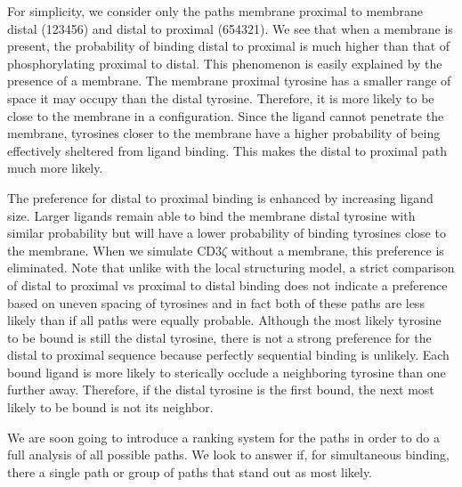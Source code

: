 \documentclass[../../AdvancementSummary.tex]{subfiles}
\begin{document}
For simplicity, we consider only the paths membrane proximal to membrane distal (123456) and distal to proximal (654321). We see that when a membrane is present, the probability of binding distal to proximal is much higher than that of phosphorylating proximal to distal. This phenomenon is easily explained by the presence of a membrane. The membrane proximal tyrosine has a smaller range of space it may occupy than the distal tyrosine.  Therefore, it is more likely to be close to the membrane in a configuration.  Since the ligand cannot penetrate the membrane, tyrosines closer to the membrane have a higher probability of being effectively sheltered from ligand binding. This makes the distal to proximal path much more likely. 

The preference for distal to proximal binding is enhanced by increasing ligand size.  Larger ligands remain able to bind the membrane distal tyrosine with similar probability but will have a lower probability of binding tyrosines close to the membrane. When we simulate CD3$\zeta$ without a membrane, this preference is eliminated.  Note that unlike with the local structuring model, a strict comparison of distal to proximal vs proximal to distal binding does not indicate a preference based on uneven spacing of tyrosines and in fact both of these paths are less likely than if all paths were equally probable. Although the most likely tyrosine to be bound is still the distal tyrosine, there is not a strong preference for the distal to proximal sequence because perfectly sequential binding is unlikely.  Each bound ligand is more likely to sterically occlude a neighboring tyrosine than one further away.  Therefore, if the distal tyrosine is the first bound, the next most likely to be bound is not its neighbor.

We are soon going to introduce a ranking system for the paths in order to do a full analysis of all possible paths. We look to answer if, for simultaneous binding, there a single path or group of paths that stand out as most likely. 
\end{document}

